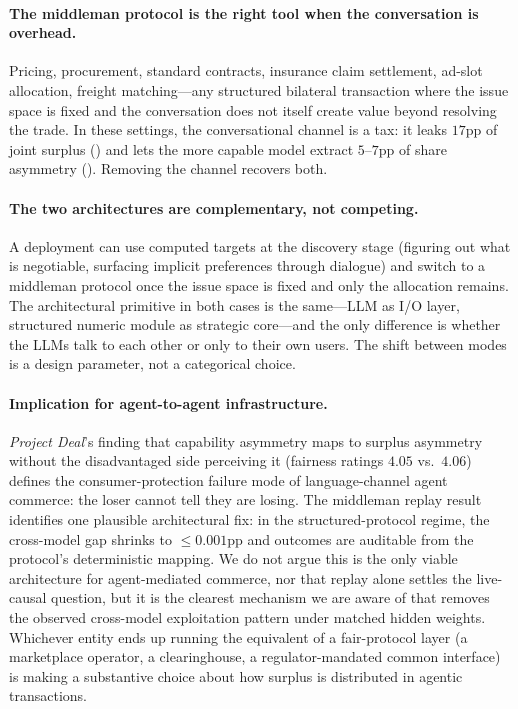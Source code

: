 \documentclass[11pt,a4paper]{article}
\begin{document}
\paragraph{The middleman protocol is the right tool when the conversation is overhead.} Pricing, procurement, standard contracts, insurance claim settlement, ad-slot allocation, freight matching---any structured bilateral transaction where the issue space is fixed and the conversation does not itself create value beyond resolving the trade. In these settings, the conversational channel is a tax: it leaks $17$pp of joint surplus () and lets the more capable model extract $5$--$7$pp of share asymmetry (). Removing the channel recovers both.

\paragraph{The two architectures are complementary, not competing.} A deployment can use computed targets at the discovery stage (figuring out what is negotiable, surfacing implicit preferences through dialogue) and switch to a middleman protocol once the issue space is fixed and only the allocation remains. The architectural primitive in both cases is the same---LLM as I/O layer, structured numeric module as strategic core---and the only difference is whether the LLMs talk to each other or only to their own users. The shift between modes is a design parameter, not a categorical choice.

\paragraph{Implication for agent-to-agent infrastructure.} \emph{Project Deal}'s finding that capability asymmetry maps to surplus asymmetry without the disadvantaged side perceiving it (fairness ratings $4.05$ vs.\ $4.06$) defines the consumer-protection failure mode of language-channel agent commerce: the loser cannot tell they are losing. The middleman replay result identifies one plausible architectural fix: in the structured-protocol regime, the cross-model gap shrinks to $\le 0.001$pp and outcomes are auditable from the protocol's deterministic mapping. We do not argue this is the only viable architecture for agent-mediated commerce, nor that replay alone settles the live-causal question, but it is the clearest mechanism we are aware of that removes the observed cross-model exploitation pattern under matched hidden weights. Whichever entity ends up running the equivalent of a fair-protocol layer (a marketplace operator, a clearinghouse, a regulator-mandated common interface) is making a substantive choice about how surplus is distributed in agentic transactions.
\end{document}
